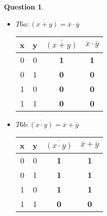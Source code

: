 \documentclass[11pt,a4paper]{article}
\theoremstyle{definition}%
\newtheorem{Q}{Question}[] %
\begin{document}
\begin{Q}
{\begin{itemize}
	\item $T6a : \overline{(x+y)} = \overline{x} \cdot \overline{y}$
	\begin{center}
	\renewcommand{\arraystretch}{1.3}
		\begin{tabular}{|c|c|c|c|} \hline
		x & y & \textbf{$\overline{(x+y)}$} & \textbf{$\overline{x} \cdot \overline{y}$} \\ \hline
		0 & 0 & \textbf{1} & \textbf{1} \\
		0 & 1 & \textbf{0} & \textbf{0} \\
		1 & 0 & \textbf{0} & \textbf{0} \\
		1 & 1 & \textbf{0} & \textbf{0} \\ \hline
		\end{tabular}
	\end{center}

	\item $T6b : \overline{(x \cdot y)} = \overline{x} + \overline{y}$
	\begin{center}
	\renewcommand{\arraystretch}{1.3}
		\begin{tabular}{|c|c|c|c|} \hline
		x & y & \textbf{$\overline{(x \cdot y)}$} & \textbf{$\overline{x} + \overline{y}$} \\ \hline
		0 & 0 & \textbf{1} & \textbf{1} \\
		0 & 1 & \textbf{1} & \textbf{1} \\
		1 & 0 & \textbf{1} & \textbf{1} \\
		1 & 1 & \textbf{0} & \textbf{0} \\ \hline
		\end{tabular}
	\end{center}
\end{itemize}
}
\end{Q}
\end{document}
